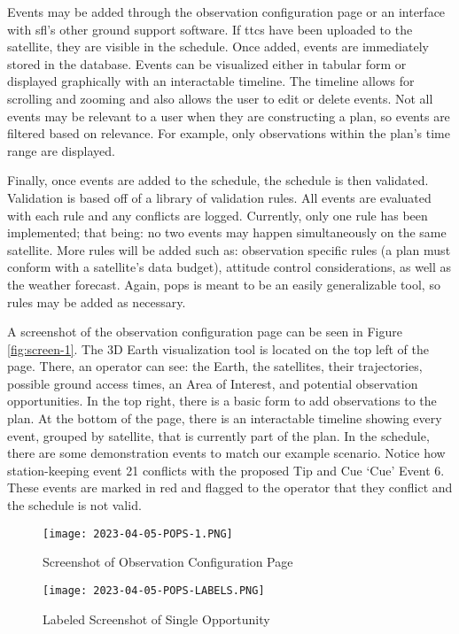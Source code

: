 Events may be added through the observation configuration page or an interface
with \gls{sfl}’s other ground support software. If \glspl{ttc} have been
uploaded to the satellite, they are visible in the schedule. Once added, events
are immediately stored in the database. Events can be visualized either in
tabular form or displayed graphically with an interactable timeline. The
timeline allows for scrolling and zooming and also allows the user to edit or
delete events. Not all events may be relevant to a user when they are
constructing a plan, so events are filtered based on relevance. For example,
only observations within the plan’s time range are displayed.

Finally, once events are added to the schedule, the schedule is then validated.
Validation is based off of a library of validation rules. All events are
evaluated with each rule and any conflicts are logged. Currently, only one rule
has been implemented; that being: no two events may happen simultaneously on
the same satellite. More rules will be added such as: observation specific
rules (a plan must conform with a satellite’s data budget), attitude control
considerations, as well as the weather forecast. Again, \gls{pops} is meant to
be an easily generalizable tool, so rules may be added as necessary.

A screenshot of the observation configuration page can be seen in Figure
\ref{fig:screen-1}. The 3D Earth visualization tool is located on the top left
of the page.  There, an operator can see: the Earth, the satellites, their
trajectories, possible ground access times, an Area of Interest, and potential
observation opportunities. In the top right, there is a basic form to add
observations to the plan. At the bottom of the page, there is an interactable
timeline showing every event, grouped by satellite, that is currently part of
the plan. In the schedule, there are some demonstration events to match our
example scenario.  Notice how station-keeping event 21 conflicts with the
proposed Tip and Cue ‘Cue’ Event 6. These events are marked in red and flagged
to the operator that they conflict and the schedule is not valid.

\begin{figure}[h] 
    \centering
    \texttt{[image: 2023-04-05-POPS-1.PNG]} 
    \caption{Screenshot of Observation Configuration Page}
    \label{fig:screen-1} 

    \texttt{[image: 2023-04-05-POPS-LABELS.PNG]} 
    \caption{Labeled Screenshot of Single Opportunity}
    \label{fig:screen-2} 
\end{figure}

